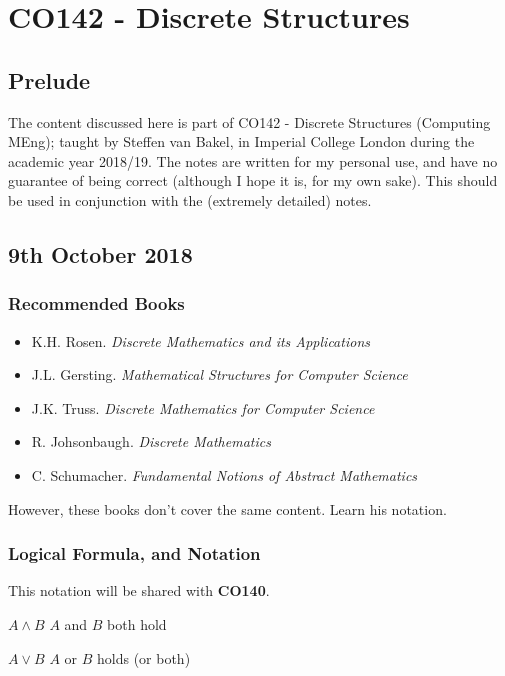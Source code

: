 \documentclass[a4paper, 12pt]{article}
\begin{document}
    \section*{CO142 - Discrete Structures}
        \subsection*{Prelude}
            The content discussed here is part of CO142 - Discrete Structures (Computing MEng); taught by Steffen van Bakel, in Imperial College London during the academic year 2018/19. The notes are written for my personal use, and have no guarantee of being correct (although I hope it is, for my own sake). This should be used in conjunction with the (extremely detailed) notes.
        \subsection*{9th October 2018}
            \subsubsection*{Recommended Books}
                \begin{itemize}
                    \item K.H. Rosen. \textit{Discrete Mathematics and its Applications}
                    \item J.L. Gersting. \textit{Mathematical Structures for Computer Science}
                    \item J.K. Truss. \textit{Discrete Mathematics for Computer Science}
                    \item R. Johsonbaugh. \textit{Discrete Mathematics}
                    \item C. Schumacher. \textit{Fundamental Notions of Abstract Mathematics}
                \end{itemize}
                However, these books don't cover the same content. Learn his notation.
            \subsubsection*{Logical Formula, and Notation}
                This notation will be shared with \textbf{CO140}.
                \medskip

                $A \land B$ \hfill $A$ and $B$ both hold
                \smallskip

                $A \lor B$ \hfill $A$ or $B$ holds (or both)
                \smallskip
\end{document}
